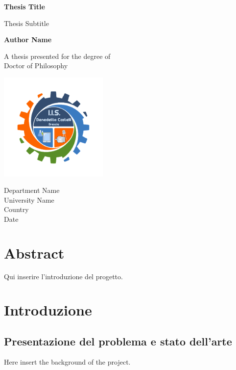 \documentclass{article}
\begin{document}
\begin{titlepage}

    \begin{center}
        \vspace*{1cm}

        \Huge
        \textbf{Thesis Title}

        \vspace{0.5cm}
        \LARGE
        Thesis Subtitle

        \vspace{1.5cm}

        \textbf{Author Name}

        \vfill

        A thesis presented for the degree of\\
        Doctor of Philosophy

        \vspace{0.8cm}

        \includegraphics[width=0.4\textwidth]{iislogo.png}

        \Large
        Department Name\\
        University Name\\
        Country\\
        Date

    \end{center}

\end{titlepage}


\section{Abstract}
Qui inserire l'introduzione del progetto.
\tableofcontents
\section{Introduzione}
\subsection{Presentazione del problema e stato dell'arte}
Here insert the background of the project.
\end{document}
